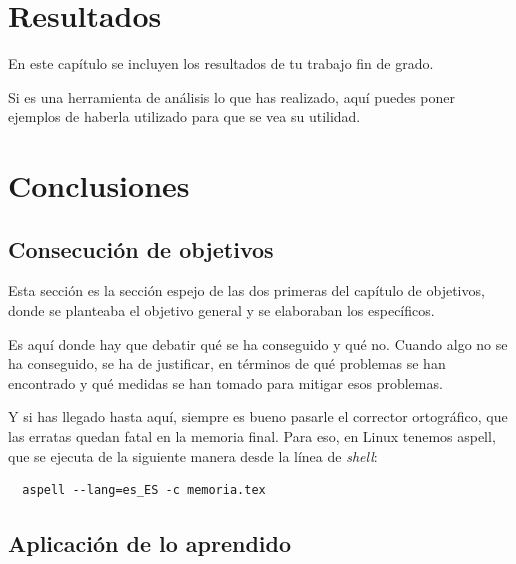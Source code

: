 \documentclass[a4paper, 12pt]{book}
\begin{document}

\cleardoublepage
\chapter{Resultados}

En este capítulo se incluyen los resultados de tu trabajo fin de grado.

Si es una herramienta de análisis lo que has realizado, aquí puedes poner ejemplos de haberla utilizado para que se vea su utilidad.



\cleardoublepage
\chapter{Conclusiones}
\label{chap:conclusiones}


\section{Consecución de objetivos}
\label{sec:consecucion-objetivos}

Esta sección es la sección espejo de las dos primeras del capítulo de objetivos, donde se planteaba el objetivo general y se elaboraban los específicos.

Es aquí donde hay que debatir qué se ha conseguido y qué no. 
Cuando algo no se ha conseguido, se ha de justificar, en términos de qué problemas se han encontrado y qué medidas se han tomado para mitigar esos problemas.

Y si has llegado hasta aquí, siempre es bueno pasarle el corrector ortográfico, que las erratas quedan fatal en la memoria final.
Para eso, en Linux tenemos aspell, que se ejecuta de la siguiente manera desde la línea de \emph{shell}:

\begin{verbatim}
  aspell --lang=es_ES -c memoria.tex
\end{verbatim}

\section{Aplicación de lo aprendido}
\label{sec:aplicacion}
\end{document}
